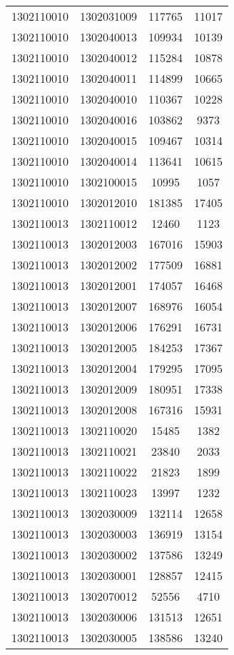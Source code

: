 \begin{longtable}[h]{llcc}
		1302110010 & 1302031009 & 117765 & 11017\\
		1302110010 & 1302040013 & 109934 & 10139\\
		1302110010 & 1302040012 & 115284 & 10878\\
		1302110010 & 1302040011 & 114899 & 10665\\
		1302110010 & 1302040010 & 110367 & 10228\\
		1302110010 & 1302040016 & 103862 & 9373\\
		1302110010 & 1302040015 & 109467 & 10314\\
		1302110010 & 1302040014 & 113641 & 10615\\
		1302110010 & 1302100015 & 10995 & 1057\\
		1302110010 & 1302012010 & 181385 & 17405\\
		1302110013 & 1302110012 & 12460 & 1123\\
		1302110013 & 1302012003 & 167016 & 15903\\
		1302110013 & 1302012002 & 177509 & 16881\\
		1302110013 & 1302012001 & 174057 & 16468\\
		1302110013 & 1302012007 & 168976 & 16054\\
		1302110013 & 1302012006 & 176291 & 16731\\
		1302110013 & 1302012005 & 184253 & 17367\\
		1302110013 & 1302012004 & 179295 & 17095\\
		1302110013 & 1302012009 & 180951 & 17338\\
		1302110013 & 1302012008 & 167316 & 15931\\
		1302110013 & 1302110020 & 15485 & 1382\\
		1302110013 & 1302110021 & 23840 & 2033\\
		1302110013 & 1302110022 & 21823 & 1899\\
		1302110013 & 1302110023 & 13997 & 1232\\
		1302110013 & 1302030009 & 132114 & 12658\\
		1302110013 & 1302030003 & 136919 & 13154\\
		1302110013 & 1302030002 & 137586 & 13249\\
		1302110013 & 1302030001 & 128857 & 12415\\
		1302110013 & 1302070012 & 52556 & 4710\\
		1302110013 & 1302030006 & 131513 & 12651\\
		1302110013 & 1302030005 & 138586 & 13240\\

\end{longtable}
